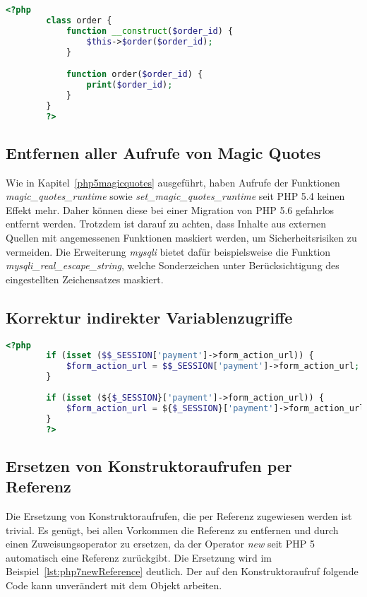     \begin{lstlisting}[language=php, caption={Beispiel der Ersetzung impliziter Konstruktoren}, label={lst:php7implicit}]
        <?php
        class order {
            function __construct($order_id) {
                $this->$order($order_id);
            }

            function order($order_id) {
                print($order_id);
            }
        }
        ?>
    \end{lstlisting}

    \subsection{}
    
    \subsection{Entfernen aller Aufrufe von Magic Quotes}
    Wie in Kapitel~\ref{php5magicquotes} ausgeführt, haben Aufrufe der Funktionen \textit{magic\_quotes\_runtime} sowie \textit{set\_magic\_quotes\_runtime} seit \ac{PHP} 5.4 
    keinen Effekt mehr. Daher können diese bei einer Migration von \ac{PHP} 5.6 gefahrlos entfernt werden. Trotzdem ist darauf zu achten, dass Inhalte aus 
    externen Quellen mit angemessenen Funktionen maskiert werden, um Sicherheitsrisiken zu vermeiden. Die Erweiterung \textit{mysqli} bietet dafür beispielsweise 
    die Funktion \textit{mysqli\_real\_escape\_string}, welche Sonderzeichen unter Berücksichtigung des eingestellten Zeichensatzes maskiert.
    
    \subsection{Korrektur indirekter Variablenzugriffe}\label{indirect}
    \begin{lstlisting}[language=php, caption={Anpassung indirekter Variablenzugriffe}, label={lst:php7newReference}]
        <?php
        if (isset ($$_SESSION['payment']->form_action_url)) {
            $form_action_url = $$_SESSION['payment']->form_action_url;
        }
        
        if (isset (${$_SESSION}['payment']->form_action_url)) {
            $form_action_url = ${$_SESSION}['payment']->form_action_url;
        }       
        ?>
    \end{lstlisting}
    
    \subsection{Ersetzen von Konstruktoraufrufen per Referenz}
    Die Ersetzung von Konstruktoraufrufen, die per Referenz zugewiesen werden ist trivial. Es genügt, bei allen Vorkommen die Referenz zu 
    entfernen und durch einen Zuweisungsoperator zu ersetzen, da der Operator \textit{new} seit \ac{PHP} 5 automatisch eine Referenz zurückgibt. 
    Die Ersetzung wird im Beispiel~\ref{lst:php7newReference} deutlich. Der auf den Konstruktoraufruf folgende Code kann unverändert mit dem Objekt arbeiten.
    

